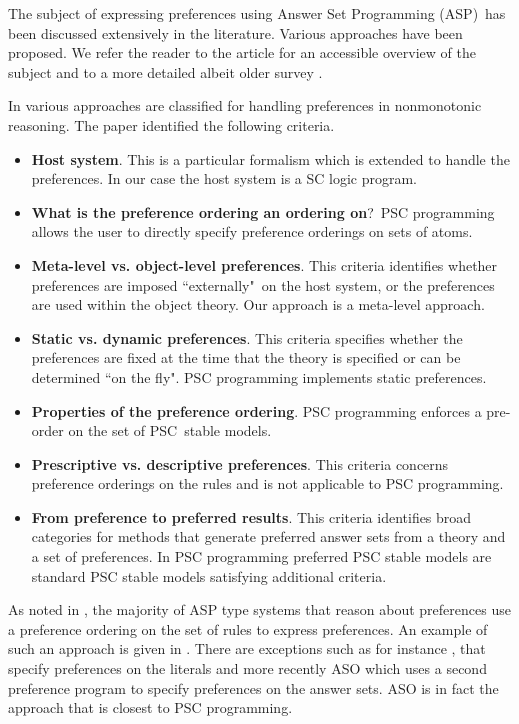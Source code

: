 \documentclass[letterpaper]{article}\usepackage{aaai}
\begin{document}
The subject of expressing preferences using Answer Set Programming (ASP)\ has
been discussed extensively in the literature. Various approaches have been
proposed. We refer the reader to the article \cite{BNT08} for an accessible
overview of the subject and to a more detailed albeit older survey
\cite{DSTW04}.

In \cite{DSTW04} various approaches are classified for handling preferences in
nonmonotonic reasoning. The paper identified the following criteria.

\begin{itemize}
\item \textbf{Host system}. This is a particular formalism which is extended
to handle the preferences. In our case the host system is a SC logic program.

\item \textbf{What is the preference ordering an ordering on}?\ PSC
programming allows the user to directly specify preference orderings on sets
of atoms.

\item \textbf{Meta-level vs. object-level preferences}. This criteria
identifies whether preferences are imposed ``externally"\ on the host system,
or the preferences are used within the object theory. Our approach is a
meta-level approach.

\item \textbf{Static vs. dynamic preferences}. This criteria specifies whether
the preferences are fixed at the time that the theory is specified or can be
determined \textquotedblleft on the fly". PSC programming implements static preferences.

\item \textbf{Properties of the preference ordering}. PSC programming enforces
a pre-order on the set of PSC\ stable models.

\item \textbf{Prescriptive vs. descriptive preferences}. This criteria
concerns preference orderings on the rules and is not applicable to PSC programming.

\item \textbf{From preference to preferred results}. This criteria identifies
broad categories for methods that generate preferred answer sets from a theory
and a set of preferences. In PSC programming preferred PSC stable models are
standard PSC stable models satisfying additional criteria.
\end{itemize}

As noted in \cite{DSTW04}, the majority of ASP type systems that reason about
preferences use a preference ordering on the set of rules to express
preferences. An example of such an approach is given in \cite{BrewkaE99}.
There are exceptions such as for instance \cite{SI00}, \cite{Brewka02} that
specify preferences on the literals and more recently ASO which uses a second
preference program to specify preferences on the answer sets. ASO is in fact
the approach that is closest to PSC programming.
\end{document}
